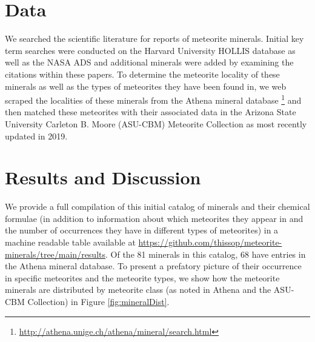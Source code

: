 \documentclass[]{aastex63}
\begin{document}
\section{Data} \label{sec:data}

We searched the scientific literature for reports of meteorite minerals. Initial key term searches were conducted on the Harvard University HOLLIS database as well as the NASA ADS and additional minerals were added by examining the citations within these papers. To determine the meteorite locality of these minerals as well as the types of meteorites they have been found in, we web scraped the localities of these minerals from the Athena mineral database \footnote{\url{http://athena.unige.ch/athena/mineral/search.html}} and then matched these meteorites with their associated data in the Arizona State University Carleton B. Moore (ASU-CBM) Meteorite Collection \citep{asu-cbm} as most recently updated in 2019.

\section{Results and Discussion}


We provide a full compilation of this initial catalog of minerals and their chemical formulae (in addition to information about which meteorites they appear in and the number of occurrences they have in different types of meteorites) in a machine readable table available at \url{https://github.com/thissop/meteorite-minerals/tree/main/results}. Of the 81 minerals in this catalog, 68 have entries in the Athena mineral database. To present a prefatory picture of their occurrence in specific meteorites and the meteorite types, we show how the meteorite minerals are distributed by meteorite class (as noted in Athena and the ASU-CBM Collection) in Figure \ref{fig:mineralDist}. 
\end{document}

